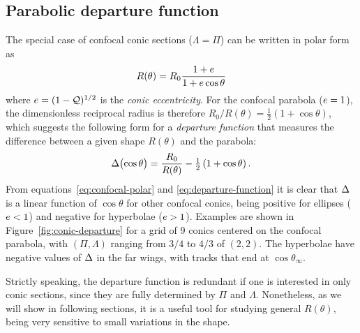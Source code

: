 \subsection{Parabolic departure function}
\label{sec:parab-depart-funct}

The special case of confocal conic sections
(\(\Lambda = \Pi\)) can be written in polar form as
\begin{equation}
  \label{eq:confocal-polar}
  R(\theta) = R_0 \frac {1 + e} {1 + e \cos \theta}
\end{equation}
where \(e = (1 - \mathcal{Q})^{1/2}\) is the \textit{conic eccentricity}.
For the confocal parabola (\(e = 1\)), the dimensionless reciprocal
radius is therefore \(R_0/R(\theta) = \tfrac12 (1 + \cos \theta)\), which
suggests the following form for a \textit{departure function} that
measures the difference between a given shape \(R(\theta)\) and the
parabola:
\begin{equation}
  \label{eq:departure-function}
  \operatorname{\Delta}\bigl(\cos \theta\bigr) = \frac{R_0} {R(\theta)} - \tfrac12 \left( 1 + \cos \theta \right). 
\end{equation}
From equations~\eqref{eq:confocal-polar} and
\eqref{eq:departure-function} it is clear that \(\operatorname{\Delta}\) is a linear
function of \(\cos \theta\) for other confocal conics, being positive for
ellipses (\(e < 1\)) and negative for hyperbolae (\(e > 1\)).
Examples are shown in Figure~\ref{fig:conic-departure} for a grid of 9
conics centered on the confocal parabola, with \((\Pi, \Lambda)\) ranging from
\(3/4\) to \(4/3\) of \((2, 2)\).  The hyperbolae have negative values
of \(\operatorname{\Delta}\) in the far wings, with tracks that end at \(\cos \theta_\infty\).

Strictly speaking, the departure function is redundant if one is
interested in only conic sections, since they are fully determined by
\(\Pi\) and \(\Lambda\).  Nonetheless, as we will show in following sections,
it is a useful tool for studying general \(R(\theta)\), being very
sensitive to small variations in the shape.



